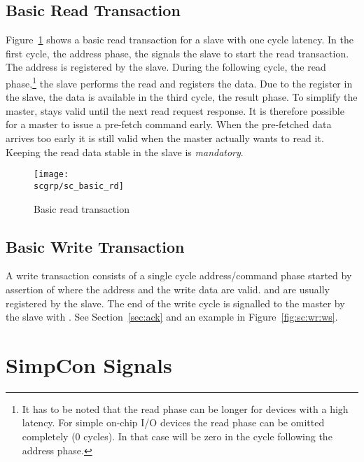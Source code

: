 \subsection{Basic Read Transaction}


Figure~\ref{fig:sc:basic:rd} shows a basic read transaction for a
slave with one cycle latency. In the first cycle, the address phase,
the  signals the slave to start the read transaction. The
address is registered by the slave. During the following cycle, the
read phase,\footnote{It has to be noted that the read phase can be
longer for devices with a high latency. For simple on-chip I/O
devices the read phase can be omitted completely (0 cycles). In that
case  will be zero in the cycle following the address
phase.} the slave performs the read and registers the data. Due to
the register in the slave, the data is available in the third cycle,
the result phase. To simplify the master,  stays valid
until the next read request response. It is therefore possible for a
master to issue a pre-fetch command early. When the pre-fetched data
arrives too early it is still valid when the master actually wants to
read it. Keeping the read data stable in the slave is
\emph{mandatory}.

\begin{figure}
    \centering
    \texttt{[image: \\scgrp/sc\_basic\_rd]}
    \caption{Basic read transaction}
    \label{fig:sc:basic:rd}
\end{figure}

\subsection{Basic Write Transaction}


A write transaction consists of a single cycle address/command phase
started by assertion of  where the address and the write
data are valid.  and  are usually
registered by the slave. The end of the write cycle is signalled to
the master by the slave with . See
Section~\ref{sec:ack} and an example in Figure~\ref{fig:sc:wr:ws}.

\section{SimpCon Signals}

